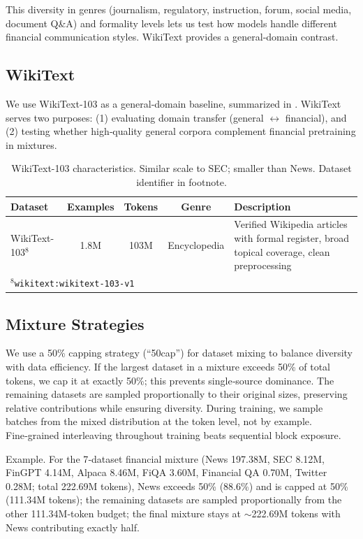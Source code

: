 This diversity in genres (journalism, regulatory, instruction, forum, social media, document Q\&A) and formality levels lets us test how models handle different financial communication styles. WikiText provides a general‑domain contrast.

\subsection{WikiText}

We use WikiText‑103 \parencite{merity2016pointer} as a general‑domain baseline, summarized in . WikiText serves two purposes: (1) evaluating domain transfer (general $\leftrightarrow$ financial), and (2) testing whether high‑quality general corpora complement financial pretraining in mixtures.

\begin{table}[h]
\centering
\caption[WikiText Dataset Characteristics]{WikiText-103 characteristics. Similar scale to SEC; smaller than News. Dataset identifier in footnote.}
\label{tab:wikitext_dataset}
\small
\begin{tabular}{p{3.4cm}cccp{5.5cm}}
\toprule
\textbf{Dataset} & \textbf{Examples} & \textbf{Tokens} & \textbf{Genre} & \textbf{Description} \\
\midrule
WikiText-103$^8$ & 1.8M & 103M & Encyclopedia & Verified Wikipedia articles with formal register, broad topical coverage, clean preprocessing \\
\bottomrule
\multicolumn{5}{l}{\footnotesize $^8$\texttt{wikitext:wikitext-103-v1}}
\end{tabular}
\end{table}

\subsection{Mixture Strategies}

We use a 50\% capping strategy (``50cap'') for dataset mixing to balance diversity with data efficiency. If the largest dataset in a mixture exceeds 50\% of total tokens, we cap it at exactly 50\%; this prevents single‑source dominance. The remaining datasets are sampled proportionally to their original sizes, preserving relative contributions while ensuring diversity. During training, we sample batches from the mixed distribution at the token level, not by example. Fine‑grained interleaving throughout training beats sequential block exposure.

Example. For the 7‑dataset financial mixture (News 197.38M, SEC 8.12M, FinGPT 4.14M, Alpaca 8.46M, FiQA 3.60M, Financial QA 0.70M, Twitter 0.28M; total 222.69M tokens), News exceeds 50\% (88.6\%) and is capped at 50\% (111.34M tokens); the remaining datasets are sampled proportionally from the other 111.34M‑token budget; the final mixture stays at $\sim$222.69M tokens with News contributing exactly half.

